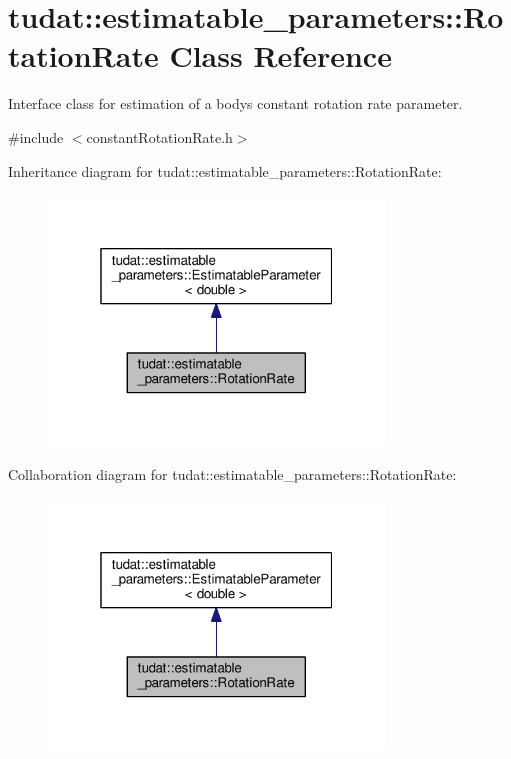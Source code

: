 \hypertarget{classtudat_1_1estimatable__parameters_1_1RotationRate}{}\section{tudat\+:\+:estimatable\+\_\+parameters\+:\+:Rotation\+Rate Class Reference}
\label{classtudat_1_1estimatable__parameters_1_1RotationRate}


Interface class for estimation of a body\textquotesingle{}s constant rotation rate parameter.  




{\ttfamily \#include $<$constant\+Rotation\+Rate.\+h$>$}



Inheritance diagram for tudat\+:\+:estimatable\+\_\+parameters\+:\+:Rotation\+Rate\+:
\nopagebreak
\begin{figure}[H]
\begin{center}
\leavevmode
\includegraphics[width=253pt]{classtudat_1_1estimatable__parameters_1_1RotationRate__inherit__graph}
\end{center}
\end{figure}


Collaboration diagram for tudat\+:\+:estimatable\+\_\+parameters\+:\+:Rotation\+Rate\+:
\nopagebreak
\begin{figure}[H]
\begin{center}
\leavevmode
\includegraphics[width=253pt]{classtudat_1_1estimatable__parameters_1_1RotationRate__coll__graph}
\end{center}
\end{figure}
